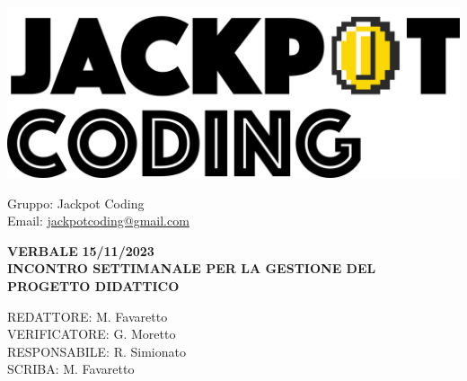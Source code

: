 \documentclass[5pt]{article}
\begin{document}
\begin{minipage}[t]{0.50\textwidth}
    \begin{flushleft}
        \hspace{10pt}
        \includegraphics[scale=0.65]{jackpot-logo.png} 
    \end{flushleft}
\end{minipage}
\hspace{-60pt} %
\begin{flushright}
    \begin{minipage}[t]{0.50\textwidth}
        \begin{flushright}
            Gruppo: {\Large Jackpot Coding}\\
            Email: \href{mailto:jackpotcoding@gmail.com}{jackpotcoding@gmail.com}
        \end{flushright}
    \end{minipage}
\end{flushright}

\vspace{15pt}

\begin{center}
    \textbf{\large VERBALE }
    \textbf{\large 15/11/2023} \\
    \textbf{\Large INCONTRO SETTIMANALE PER LA GESTIONE DEL PROGETTO DIDATTICO}
\end{center}

\vspace{13pt}

\begin{flushleft}
    \begin{spacing}{1.5}
        REDATTORE:  M. Favaretto\\%
        VERIFICATORE: G. Moretto  \\%
        RESPONSABILE:   R. Simionato\\%
        \vspace{7pt}
        SCRIBA: M. Favaretto\\%
    \end{spacing}
\end{flushleft}
\end{document}
